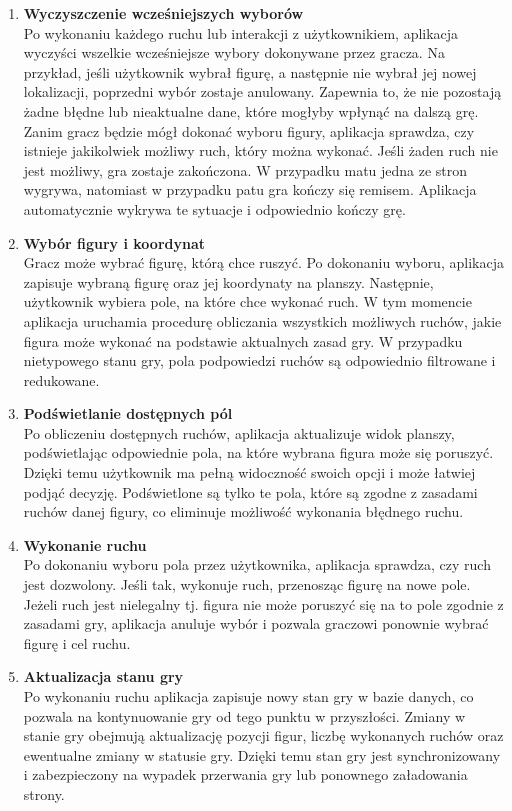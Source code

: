 \documentclass[twoside]{projektInzynierskiMS1}
\begin{document}
\begin{enumerate}
    \item \textbf{Wyczyszczenie wcześniejszych wyborów}\\
    Po wykonaniu każdego ruchu lub interakcji z użytkownikiem, aplikacja wyczyści wszelkie wcześniejsze wybory dokonywane przez gracza. Na przykład, jeśli użytkownik wybrał figurę, a następnie nie wybrał jej nowej lokalizacji, poprzedni wybór zostaje anulowany. Zapewnia to, że nie pozostają żadne błędne lub nieaktualne dane, które mogłyby wpłynąć na dalszą grę. Zanim gracz będzie mógł dokonać wyboru figury, aplikacja sprawdza, czy istnieje jakikolwiek możliwy ruch, który można wykonać. Jeśli żaden ruch nie jest możliwy, gra zostaje zakończona. W przypadku matu jedna ze stron wygrywa, natomiast w przypadku patu gra kończy się remisem. Aplikacja automatycznie wykrywa te sytuacje i odpowiednio kończy grę.

    \item \textbf{Wybór figury i koordynat}\\
    Gracz może wybrać figurę, którą chce ruszyć. Po dokonaniu wyboru, aplikacja zapisuje wybraną figurę oraz jej koordynaty na planszy. Następnie, użytkownik wybiera pole, na które chce wykonać ruch. W tym momencie aplikacja uruchamia procedurę obliczania wszystkich możliwych ruchów, jakie figura może wykonać na podstawie aktualnych zasad gry. W przypadku nietypowego stanu gry,  pola podpowiedzi ruchów są odpowiednio filtrowane i redukowane.

\newpage

    \item \textbf{Podświetlanie dostępnych pól}\\
    Po obliczeniu dostępnych ruchów, aplikacja aktualizuje widok planszy, podświetlając odpowiednie pola, na które wybrana figura może się poruszyć. Dzięki temu użytkownik ma pełną widoczność swoich opcji i może łatwiej podjąć decyzję. Podświetlone są tylko te pola, które są zgodne z zasadami ruchów danej figury, co eliminuje możliwość wykonania błędnego ruchu.

    \item \textbf{Wykonanie ruchu}\\
    Po dokonaniu wyboru pola przez użytkownika, aplikacja sprawdza, czy ruch jest dozwolony. Jeśli tak, wykonuje ruch, przenosząc figurę na nowe pole. Jeżeli ruch jest nielegalny tj. figura nie może poruszyć się na to pole zgodnie z zasadami gry, aplikacja anuluje wybór i pozwala graczowi ponownie wybrać figurę i cel ruchu.

    \item \textbf{Aktualizacja stanu gry}\\
    Po wykonaniu ruchu aplikacja zapisuje nowy stan gry w bazie danych, co pozwala na kontynuowanie gry od tego punktu w przyszłości. Zmiany w stanie gry obejmują aktualizację pozycji figur, liczbę wykonanych ruchów oraz ewentualne zmiany w statusie gry. Dzięki temu stan gry jest synchronizowany i zabezpieczony na wypadek przerwania gry lub ponownego załadowania strony.


\end{enumerate}
\end{document}
